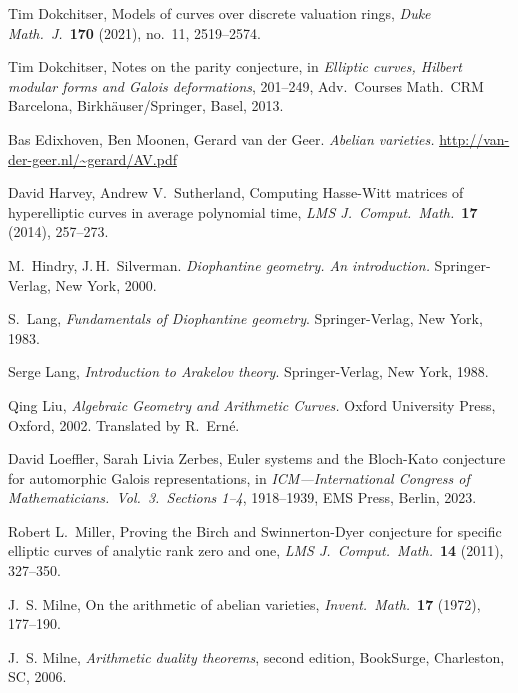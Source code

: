 \documentclass[12pt]{article}
\theoremstyle{definition}
\numberwithin{equation}{subsection}
\begin{document}
\begin{thebibliography}{HyperUser}
    Tim Dokchitser,
    Models of curves over discrete valuation rings,
    {\em Duke Math.\ J.}\ {\bf 170} (2021), no.~11, 2519--2574.

    Tim Dokchitser,
    Notes on the parity conjecture,
    in {\it Elliptic curves, Hilbert modular forms and Galois deformations}, 201--249, Adv.\ Courses Math.\ CRM Barcelona, Birkh\"auser/Springer, Basel, 2013.

    Bas Edixhoven, Ben Moonen, Gerard van der Geer.
    {\em Abelian varieties.}
    \url{http://van-der-geer.nl/~gerard/AV.pdf}

    David Harvey, Andrew V.\ Sutherland,
    Computing Hasse-Witt matrices of hyperelliptic curves in average polynomial time,
    {\em LMS J.\ Comput.\ Math.}\ {\bf 17} (2014), 257--273.

	M.\ Hindry, J.\,H.\ Silverman.
	{\em Diophantine geometry. An introduction.}
	Springer-Verlag, New York, 2000.

	S.\ Lang,
	\emph{Fundamentals of Diophantine geometry}.
	Springer-Verlag, New York, 1983.

    Serge Lang,
    \emph{Introduction to Arakelov theory}.
    Springer-Verlag, New York, 1988.

	Qing Liu,
	\emph{Algebraic Geometry and Arithmetic Curves.}
	Oxford University Press, Oxford, 2002.
	Translated by R.\ Ern\'e.

    David Loeffler, Sarah Livia Zerbes,
    Euler systems and the Bloch-Kato conjecture for automorphic Galois representations,
    in {\it ICM---International Congress of Mathematicians.\ Vol.\ 3.\ Sections 1--4}, 1918--1939, EMS Press, Berlin, 2023.

    Robert L.\ Miller,
    Proving the Birch and Swinnerton-Dyer conjecture for specific elliptic curves of analytic rank zero and one,
    {\em LMS J.\ Comput.\ Math.}\ {\bf 14} (2011), 327--350.

    J.~S. Milne,
    On the arithmetic of abelian varieties,
    {\em Invent.\ Math.}\ {\bf 17} (1972), 177--190.

    J.~S. Milne, {\it Arithmetic duality theorems},
    second edition, BookSurge, Charleston, SC, 2006.


\end{thebibliography}
\end{document}
